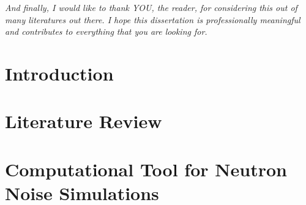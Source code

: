 \documentclass{uiucthesis2021}
\begin{document}
\begin{acknowledgments}
\textit{And finally, I would like to thank YOU, the reader, for considering this out of many literatures out there. I hope this dissertation is professionally meaningful and contributes to everything that you are looking for.}

\end{acknowledgments}

{
    \hypersetup{linkcolor=black}  %
    \tableofcontents
}

%
%
%

\mainmatter

\chapter{Introduction}


\chapter{Literature Review}


\chapter{Computational Tool for Neutron Noise Simulations}


%
\end{document}
